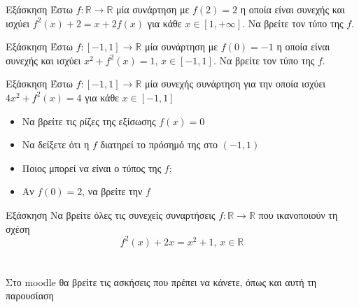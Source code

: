\documentclass[greek]{beamer}
\begin{document}
\begin{frame}{Εξάσκηση}
 Έστω $f:\mathbb{R}\to\mathbb{R}$ μία συνάρτηση με $f(2)=2$ η οποία είναι συνεχής και ισχύει $f^2(x)+2=x+2f(x)$ για κάθε $x\in [1,+\infty]$. Να βρείτε τον τύπο της $f$.
\end{frame}

\begin{frame}{Εξάσκηση}
 Έστω $f:[-1,1]\to\mathbb{R}$ μία συνάρτηση με $f(0)=-1$ η οποία είναι συνεχής και ισχύει $x^2+f^2(x)=1$, $x\in [-1,1]$. Να βρείτε τον τύπο της $f$.
\end{frame}

\begin{frame}{Εξάσκηση}
 Έστω $f:[-1,1]\to\mathbb{R}$ μία συνεχής συνάρτηση για την οποία ισχύει $4x^2+f^2(x)=4$ για κάθε $x\in [-1,1]$
 \begin{itemize}
   \item Να βρείτε τις ρίζες της εξίσωσης $f(x)=0$
   \item Να δείξετε ότι η $f$ διατηρεί το πρόσημό της στο $(-1,1)$
   \item Ποιος μπορεί να είναι ο τύπος της $f$;
   \item Αν $f(0)=2$, να βρείτε την $f$
 \end{itemize}
\end{frame}

\begin{frame}{Εξάσκηση}
 Να βρείτε όλες τις συνεχείς συναρτήσεις $f:\mathbb{R}\to\mathbb{R}$ που ικανοποιούν τη σχέση
 $$f^2(x)+2x=x^2+1 \text{, } x\in\mathbb{R}$$
\end{frame}

\section{}
\begin{frame}
 Στο moodle θα βρείτε τις ασκήσεις που πρέπει να κάνετε, όπως και αυτή τη παρουσίαση
\end{frame}
\end{document}
